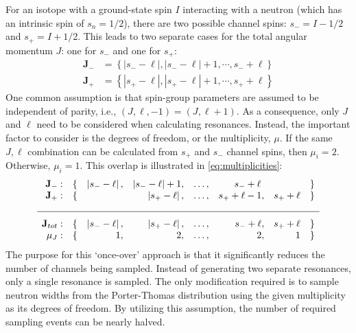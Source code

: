         For an isotope with a ground-state spin $I$ interacting with a neutron (which has an intrinsic spin of $s_n = 1/2$), there are two possible channel spins: $s_{-} = I - 1/2$ and $s_{+} = I + 1/2$. This leads to two separate cases for the total angular momentum $J$: one for $s_{-}$ and one for $s_{+}$:
        \begin{align}
            \mathbf{J}_{-} &= \left\{ \left|s_{-} - \ell\right|, \left|s_{-} - \ell\right| + 1, \cdots, s_{-} + \ell \right\}\\
            \mathbf{J}_{+} &= \left\{ \left|s_{+} - \ell\right|, \left|s_{+} - \ell\right| + 1, \cdots, s_{+} + \ell \right\}
        \end{align}
        One common assumption is that spin-group parameters are assumed to be independent of parity\cite{endf-manual}, i.e., $(J, \ell, -1) = (J, \ell +1)$. As a consequence, only $J$ and $\ell$ need to be considered when calculating resonances. Instead, the important factor to consider is the degrees of freedom, or the multiplicity, $\mu$. If the same $J,\ell$ combination can be calculated from $s_{+}$ and $s_{-}$ channel spins, then $\mu_i = 2$. Otherwise, $\mu_i=1$. This overlap is illustrated in \autoref{eq:multiplicities}:
        \begin{equation}
            \label{eq:multiplicities}
            \begin{array}{rrrrrrrr}
            \mathbf{J}_{-}: & \{ & \left|s_{-} - \ell\right|, & \left|s_{-} - \ell\right| + 1, & \dots, & s_{-} + \ell ~ & & \} \\
            \mathbf{J}_{+}: & \{ & & \left|s_{+} - \ell\right|, & \dots, & s_{+} + \ell-1, & s_{+} + \ell & \} \\[1em] \hline \\[-0.5em]
            \mathbf{J}_{tot}: & \{ & \left|s_{-} - \ell\right|, & \left|s_{+} - \ell\right|, & \dots, & s_{-} + \ell, & s_{+} + \ell & \} \\
            \mathbf{\mu}_J: & \{ & 1, & 2, & \dots, & 2, & 1 & \} \\
            \end{array}
        \end{equation}
        The purpose for this `once-over' approach is that it significantly reduces the number of channels being sampled. Instead of generating two separate resonances, only a single resonance is sampled. The only modification required is to sample neutron widths from the Porter-Thomas distribution using the given multiplicity as its degrees of freedom. By utilizing this assumption, the number of required sampling events can be nearly halved.
    
